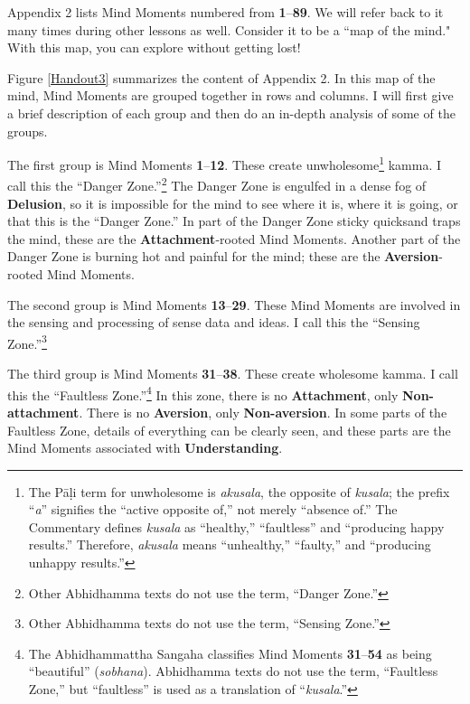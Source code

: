 Appendix 2 lists Mind Moments numbered from \textbf{1}--\textbf{89}. We will refer back to it many times during other lessons as well. Consider it to be a ``map of the mind." With this map, you can explore without getting lost! 

Figure \ref{Handout3} summarizes the content of Appendix 2. In this map of the mind, Mind Moments are grouped together in rows and columns. I will first give a brief description of each group and then do an in-depth analysis of some of the groups.

\pagebreak

The first group is Mind Moments \textbf{1}--\textbf{12}. These create unwholesome\footnote{The Pāḷi term for unwholesome is \textit{akusala}, the opposite of \textit{kusala}; the prefix “\textit{a}” signifies the “active opposite of,” not merely “absence of.” The Commentary defines \textit{kusala} as “healthy,” “faultless” and “producing happy results.” Therefore, \textit{akusala} means “unhealthy,” “faulty,” and “producing unhappy results.”} kamma. I call this the “Danger Zone.”\footnote{Other Abhidhamma texts do not use the term, “Danger Zone.”} The Danger Zone is engulfed in a dense fog of \textbf{Delusion}, so it is impossible for the mind to see where it is, where it is going, or that this is the “Danger Zone.” In part of the Danger Zone sticky quicksand traps the mind, these are the \textbf{Attachment}-rooted Mind Moments. Another part of the Danger Zone is burning hot and painful for the mind; these are the \textbf{Aversion}-rooted Mind Moments.

The second group is Mind Moments \textbf{13}--\textbf{29}. These Mind Moments are involved in the sensing and processing of sense data and ideas. I call this the “Sensing Zone.”\footnote{Other Abhidhamma texts do not use the term, “Sensing Zone.”}

The third group is Mind Moments \textbf{31}--\textbf{38}. These create wholesome kamma. I call this the “Faultless Zone.”\footnote{The Abhidhammattha Sangaha classifies Mind Moments \textbf{31}--\textbf{54} as being “beautiful” (\textit{sobhana}). Abhidhamma texts do not use the term, “Faultless Zone,” but “faultless” is used as a translation of “\textit{kusala}.”} In this zone, there is no \textbf{Attachment}, only \textbf{Non-attachment}. There is no \textbf{Aversion}, only \textbf{Non-aversion}. In some parts of the Faultless Zone, details of everything can be clearly seen, and these parts are the Mind Moments associated with \textbf{Understanding}.

